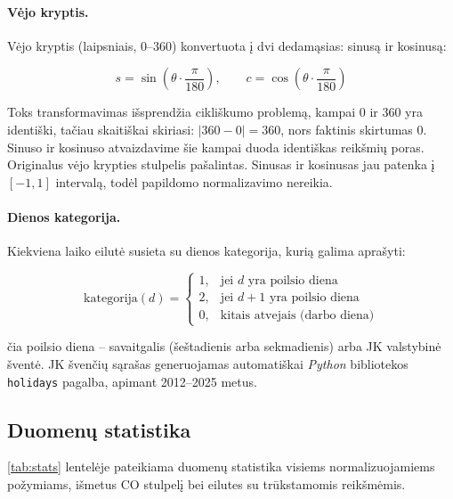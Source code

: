 \documentclass[]{VUMIFTemplateClass}
\begin{document}
    \paragraph{Vėjo kryptis.}
    Vėjo kryptis (laipsniais, 0--360\textdegree) konvertuota į dvi dedamąsias: sinusą ir kosinusą:

    \begin{equation}
        s = \sin\!\left(\theta \cdot \frac{\pi}{180}\right), \qquad
        c = \cos\!\left(\theta \cdot \frac{\pi}{180}\right)
        \label{eq:windsincos}
    \end{equation}

    Toks transformavimas išsprendžia cikliškumo problemą, kampai 0\textdegree{} ir 360\textdegree{} yra identiški, tačiau skaitiškai skiriasi: $|360 - 0| = 360$, nors faktinis skirtumas 0\textdegree.
    Sinuso ir kosinuso atvaizdavime šie kampai duoda identiškas reikšmių poras.
    Originalus vėjo krypties stulpelis pašalintas.
    Sinusas ir kosinusas jau patenka į $[-1, 1]$ intervalą, todėl papildomo normalizavimo nereikia.

    \paragraph{Dienos kategorija.}
    Kiekviena laiko eilutė susieta su dienos kategorija, kurią galima aprašyti:

    \begin{equation}
        \text{kategorija}(d) =
        \begin{cases}
            1, & \text{jei } d \text{ yra poilsio diena} \\
            2, & \text{jei } d+1 \text{ yra poilsio diena} \\
            0, & \text{kitais atvejais (darbo diena)}
        \end{cases}
        \label{eq:daycat}
    \end{equation}

    čia poilsio diena -- savaitgalis (šeštadienis arba sekmadienis) arba JK valstybinė šventė. JK švenčių sąrašas generuojamas automatiškai \textit{Python} bibliotekos \texttt{holidays} pagalba, apimant 2012--2025 metus.

    \subsection{Duomenų statistika}

    \ref{tab:stats} lentelėje pateikiama duomenų statistika visiems normalizuojamiems požymiams, išmetus CO stulpelį bei eilutes su trūkstamomis reikšmėmis.
\end{document}

